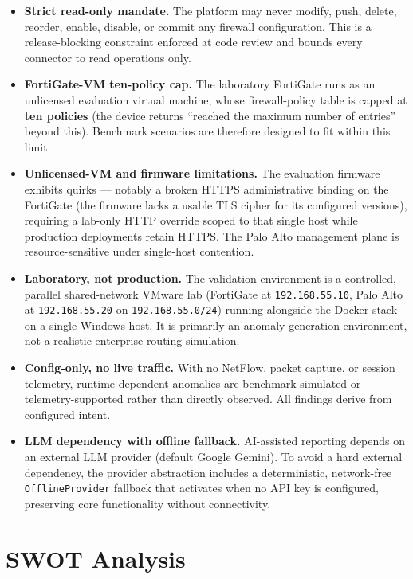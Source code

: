 \begin{itemize}[leftmargin=1.4em]
  \item \textbf{Strict read-only mandate.} The platform may never modify, push, delete, reorder, enable, disable, or commit any firewall configuration. This is a release-blocking constraint enforced at code review and bounds every connector to read operations only.
  \item \textbf{FortiGate-VM ten-policy cap.} The laboratory FortiGate runs as an unlicensed evaluation virtual machine, whose firewall-policy table is capped at \textbf{ten policies} (the device returns ``reached the maximum number of entries'' beyond this). Benchmark scenarios are therefore designed to fit within this limit.
  \item \textbf{Unlicensed-VM and firmware limitations.} The evaluation firmware exhibits quirks --- notably a broken HTTPS administrative binding on the FortiGate (the firmware lacks a usable TLS cipher for its configured versions), requiring a lab-only HTTP override scoped to that single host while production deployments retain HTTPS. The Palo Alto management plane is resource-sensitive under single-host contention.
  \item \textbf{Laboratory, not production.} The validation environment is a controlled, parallel shared-network VMware lab (FortiGate at \texttt{192.168.55.10}, Palo Alto at \texttt{192.168.55.20} on \texttt{192.168.55.0/24}) running alongside the Docker stack on a single Windows host. It is primarily an anomaly-generation environment, not a realistic enterprise routing simulation.
  \item \textbf{Config-only, no live traffic.} With no NetFlow, packet capture, or session telemetry, runtime-dependent anomalies are benchmark-simulated or telemetry-supported rather than directly observed. All findings derive from configured intent.
  \item \textbf{LLM dependency with offline fallback.} AI-assisted reporting depends on an external LLM provider (default Google Gemini). To avoid a hard external dependency, the provider abstraction includes a deterministic, network-free \texttt{OfflineProvider} fallback that activates when no API key is configured, preserving core functionality without connectivity.
\end{itemize}

\section{SWOT Analysis}
\label{sec:ch1-swot}

